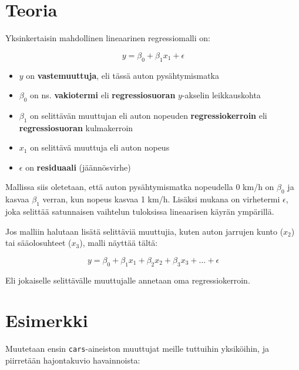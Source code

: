 \documentclass[
]{book}
\newenvironment{Shaded}{\begin{snugshade}}{\end{snugshade}}
\newcommand{\AttributeTok}[1]{\textcolor[rgb]{0.77,0.63,0.00}{#1}}
\newcommand{\CommentTok}[1]{\textcolor[rgb]{0.56,0.35,0.01}{\textit{#1}}}
\newcommand{\FloatTok}[1]{\textcolor[rgb]{0.00,0.00,0.81}{#1}}
\newcommand{\FunctionTok}[1]{\textcolor[rgb]{0.00,0.00,0.00}{#1}}
\newcommand{\NormalTok}[1]{#1}
\newcommand{\OtherTok}[1]{\textcolor[rgb]{0.56,0.35,0.01}{#1}}
\newcommand{\SpecialCharTok}[1]{\textcolor[rgb]{0.00,0.00,0.00}{#1}}
\newcommand{\StringTok}[1]{\textcolor[rgb]{0.31,0.60,0.02}{#1}}
\providecommand{\tightlist}{%
  \setlength{\itemsep}{0pt}\setlength{\parskip}{0pt}}
\begin{document}
\hypertarget{teoria}{%
\section{Teoria}\label{teoria}}

Yksinkertaisin mahdollinen lineaarinen regressiomalli on:

\[ y = \beta_0 + \beta_1 x_1 + \epsilon \]

\begin{itemize}
\tightlist
\item
  \(y\) on \textbf{vastemuuttuja}, eli tässä auton pysähtymismatka
\item
  \(\beta_0\) on ns. \textbf{vakiotermi} eli \textbf{regressiosuoran} \(y\)-akselin leikkauskohta
\item
  \(\beta_1\) on selittävän muuttujan eli auton nopeuden \textbf{regressiokerroin} eli \textbf{regressiosuoran} kulmakerroin
\item
  \(x_1\) on selittävä muuttuja eli auton nopeus
\item
  \(\epsilon\) on \textbf{residuaali} (jäännösvirhe)
\end{itemize}

Mallissa siis oletetaan, että auton pysähtymismatka nopeudella 0 km/h on \(\beta_0\) ja kasvaa \(\beta_1\) verran, kun nopeus kasvaa 1 km/h. Lisäksi mukana on virhetermi \(\epsilon\), joka selittää satunnaisen vaihtelun tuloksissa lineaarisen käyrän ympärillä.

Jos malliin halutaan lisätä selittäviä muuttujia, kuten auton jarrujen kunto (\(x_2\)) tai sääolosuhteet (\(x_3\)), malli näyttää tältä:

\[ y = \beta_0 + \beta_1 x_1 + \beta_2 x_2 + \beta_3 x_3 + \ldots + \epsilon \]

Eli jokaiselle selittävälle muuttujalle annetaan oma regressiokerroin.

\hypertarget{esimerkki}{%
\section{Esimerkki}\label{esimerkki}}

Muutetaan ensin \texttt{cars}-aineiston muuttujat meille tuttuihin yksiköihin, ja piirretään hajontakuvio havainnoista:

\begin{Shaded}
\end{Shaded}
\end{document}
